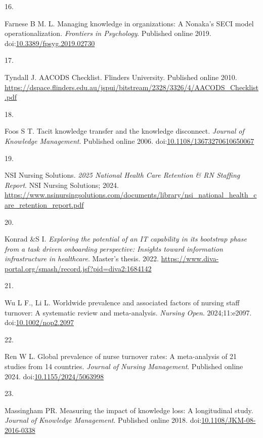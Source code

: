 \documentclass[
  american,
  11pt,
  letterpaper,
  oneside  ,captions=tableheading
]{scrartcl}
\newlength{\cslhangindent}
\newlength{\csllabelwidth}
\newenvironment{CSLReferences}[2] %
 {\begin{list}{}{%
  \setlength{\itemindent}{0pt}
  \setlength{\leftmargin}{0pt}
  \setlength{\parsep}{0pt}
  \ifodd #1
   \setlength{\leftmargin}{\cslhangindent}
   \setlength{\itemindent}{-1\cslhangindent}
  \fi
  \setlength{\itemsep}{#2\baselineskip}}}
 {\end{list}}
\newcommand{\CSLLeftMargin}[1]{\parbox[t]{\csllabelwidth}{\strut#1\strut}}
\newcommand{\CSLRightInline}[1]{\parbox[t]{\linewidth - \csllabelwidth}{\strut#1\strut}}
\begin{document}
\begin{CSLReferences}{0}{1}
\CSLLeftMargin{16. }%
\CSLRightInline{Farnese B M. L. {Managing knowledge in organizations: A
Nonaka's {SECI} model operationalization}. \emph{Frontiers in
Psychology}. Published online 2019.
doi:\href{https://doi.org/10.3389/fpsyg.2019.02730}{10.3389/fpsyg.2019.02730}}

\CSLLeftMargin{17. }%
\CSLRightInline{Tyndall J. {{AACODS} Checklist. Flinders University}.
Published online 2010.
\url{https://dspace.flinders.edu.au/jspui/bitstream/2328/3326/4/AACODS_Checklist.pdf}}

\CSLLeftMargin{18. }%
\CSLRightInline{Foos S T. {Tacit knowledge transfer and the knowledge
disconnect}. \emph{Journal of Knowledge Management}. Published online
2006.
doi:\href{https://doi.org/10.1108/13673270610650067}{10.1108/13673270610650067}}

\CSLLeftMargin{19. }%
\CSLRightInline{NSI Nursing Solutions. \emph{{2025 National Health Care
Retention \& RN Staffing Report}}. NSI Nursing Solutions; 2024.
\url{https://www.nsinursingsolutions.com/documents/library/nsi_national_health_care_retention_report.pdf}}

\CSLLeftMargin{20. }%
\CSLRightInline{Konrad \&S I. \emph{{Exploring the potential of an {IT}
capability in its bootstrap phase from a task driven onboarding
perspective: Insights toward information infrastructure in healthcare}}.
Master's thesis. 2022.
\url{https://www.diva-portal.org/smash/record.jsf?pid=diva2:1684142}}

\CSLLeftMargin{21. }%
\CSLRightInline{Wu L F., Li L. {Worldwide prevalence and associated
factors of nursing staff turnover: A systematic review and
meta-analysis}. \emph{Nursing Open}. 2024;11:e2097.
doi:\href{https://doi.org/10.1002/nop2.2097}{10.1002/nop2.2097}}

\CSLLeftMargin{22. }%
\CSLRightInline{Ren W L. {Global prevalence of nurse turnover rates: A
meta-analysis of 21 studies from 14 countries}. \emph{Journal of Nursing
Management}. Published online 2024.
doi:\href{https://doi.org/10.1155/2024/5063998}{10.1155/2024/5063998}}

\CSLLeftMargin{23. }%
\CSLRightInline{Massingham PR. {Measuring the impact of knowledge loss:
A longitudinal study}. \emph{Journal of Knowledge Management}. Published
online 2018.
doi:\href{https://doi.org/10.1108/JKM-08-2016-0338}{10.1108/JKM-08-2016-0338}}


\end{CSLReferences}
\end{document}
